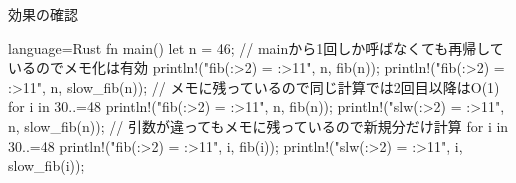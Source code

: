 \documentclass{beamer}
\begin{document}
\begin{frame}[fragile]{効果の確認}{}

\begin{codeof}{language=Rust}{}
fn main() {
    let n = 46;
    // mainから1回しか呼ばなくても再帰しているのでメモ化は有効
    println!("fib({:>2}) = {:>11}", n, fib(n));
    println!("fib({:>2}) = {:>11}", n, slow_fib(n));
    // メモに残っているので同じ計算では2回目以降はO(1)
    for i in 30..=48 {
        println!("fib({:>2}) = {:>11}", n, fib(n));
        println!("slw({:>2}) = {:>11}", n, slow_fib(n));
    }
    // 引数が違ってもメモに残っているので新規分だけ計算
    for i in 30..=48 {
        println!("fib({:>2}) = {:>11}", i, fib(i));
        println!("slw({:>2}) = {:>11}", i, slow_fib(i));
    }
}
\end{codeof}
\end{frame}
\end{document}
